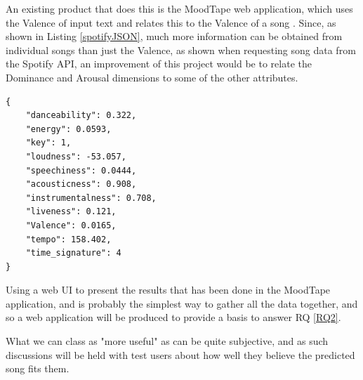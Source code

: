 An existing product that does this is the MoodTape web application, which uses the Valence of input text and relates this to the Valence of a song  \cite{moodtape}. Since, as shown in Listing \ref{spotifyJSON}, much more information can be obtained from individual songs than just the Valence, as shown when requesting song data from the Spotify API, an improvement of this project would be to relate the Dominance and Arousal dimensions to some of the other attributes.
\pagebreak
\begin{lstlisting}[style=leftCode, caption={Some of the attributes of a song obtained through requesting information through the Spotify API},captionpos=b, label={spotifyJSON}]
{
    "danceability": 0.322,
    "energy": 0.0593,
    "key": 1,
    "loudness": -53.057,
    "speechiness": 0.0444,
    "acousticness": 0.908,
    "instrumentalness": 0.708,
    "liveness": 0.121,
    "Valence": 0.0165,
    "tempo": 158.402,
    "time_signature": 4
}
\end{lstlisting}

Using a web UI to present the results that has been done in the MoodTape application, and is probably the simplest way to gather all the data together, and so a web application will be produced to provide a basis to answer RQ \ref{RQ2}.

What we can class as "more useful" as can be quite subjective, and as such discussions will be held with test users about how well they believe the predicted song fits them.